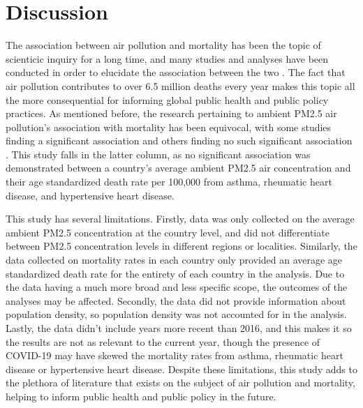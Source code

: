 \documentclass[12pt, letterpaper, twoside]{article}\usepackage[]{graphicx}\usepackage[]{xcolor}
\begin{document}
\section*{Discussion}
The association between air pollution and mortality has been the topic of
scienticic inquiry for a long time, and many studies and analyses have been
conducted in order to elucidate the association between the two
\citep{dockery1993association, sunyer1996air, jerrett2005spatial, analitis2006short}.
The fact that air pollution contributes to over 6.5 million deaths every year
\citep{fuller2022pollution} makes this topic all the more consequential for
informing global public health and public policy practices. As mentioned before,
the research pertaining to ambient PM2.5 air pollution's association with
mortality has been equivocal, with some studies finding a significant association
\citep{analitis2006short} and others finding no such significant association
\citep{khojasteh2021long}. This study falls in the latter column, as no
significant association was demonstrated between a country's average ambient
PM2.5 air concentration and their age standardized death rate per 100,000 from
asthma, rheumatic heart disease, and hypertensive heart disease.\par
This study has several limitations. Firstly, data was only collected on the
average ambient PM2.5 concentration at the country level, and did not
differentiate between PM2.5 concentration levels in different regions or
localities. Similarly, the data collected on mortality rates in each country
only provided an average age standardized death rate for the entirety of each
country in the analysis. Due to the data having a much more broad and less
specific scope, the outcomes of the analyses may be affected. Secondly, the data
did not provide information about population density, so population density
was not accounted for in the analysis. Lastly, the data didn't include years
more recent than 2016, and this makes it so the results are not as relevant to
the current year, though the presence of COVID-19 may have skewed the mortality
rates from asthma, rheumatic heart disease or hypertensive heart disease. Despite
these limitations, this study adds to the plethora of literature that exists on
the subject of air pollution and mortality, helping to inform public health and
public policy in the future.



\end{document}
